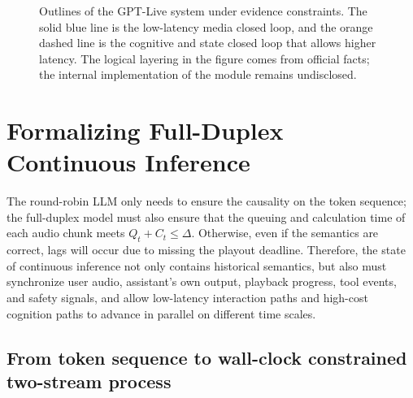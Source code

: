 \documentclass[UTF8,fontset=none,a4paper,10pt]{ctexart}
\begin{document}
\begin{figure}[H]
\centering
{}
\caption{Outlines of the GPT-Live system under evidence constraints. The solid blue line is the low-latency media closed loop, and the orange dashed line is the cognitive and state closed loop that allows higher latency. The logical layering in the figure comes from official facts; the internal implementation of the module remains undisclosed.}
\label{en:fig:official-architecture}
\end{figure}

\section{Formalizing Full-Duplex Continuous Inference}

The round-robin LLM only needs to ensure the causality on the token sequence; the full-duplex model must also ensure that the queuing and calculation time of each audio chunk meets $Q_t+C_t\leq\Delta$. Otherwise, even if the semantics are correct, lags will occur due to missing the playout deadline. Therefore, the state of continuous inference not only contains historical semantics, but also must synchronize user audio, assistant's own output, playback progress, tool events, and safety signals, and allow low-latency interaction paths and high-cost cognition paths to advance in parallel on different time scales.

\subsection{From token sequence to wall-clock constrained two-stream process}
\end{document}
